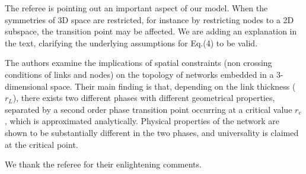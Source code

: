 \documentclass[11pt]{article}
\begin{document}
\begin{response}
The referee is pointing out an important aspect of our model. 
When the symmetries of 3D space are restricted, for instance by restricting nodes to a 2D subspace, the transition point may be affected. We are adding an explanation in the text, clarifying the underlying assumptions for Eq.(4) to be valid.



\end{response}

\newpage

\begin{response}{The authors examine the implications of spatial constraints (non crossing conditions of links and nodes) on the topology of networks embedded in a 3-dimensional space. 
Their main finding is that, depending on the link thickness ($r_L$), there exists two different phases with different geometrical properties, separated by a second order phase transition point occurring at a critical value $r_c$, which is approximated analytically. 
Physical properties of the network are shown to be substantially different in the two phases, and universality is claimed at the critical point. 
}

We thank the referee for their enlightening comments. 
\end{response}
\end{document}
